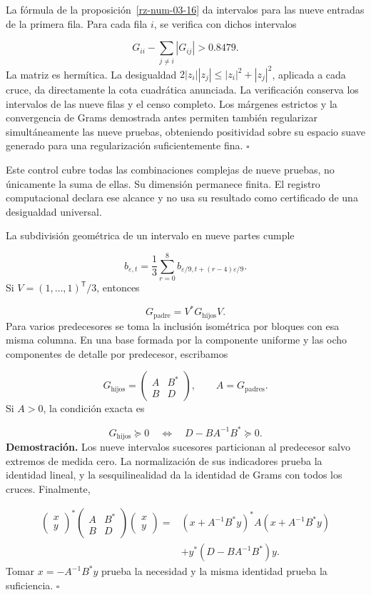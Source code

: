 La fórmula de la proposición~\ref{rz-num-03-16} da intervalos para las nueve entradas de la primera fila. Para cada fila \(i\), se verifica con dichos intervalos

\[
G_{ii}-\sum_{j\neq i}|G_{ij}|>0.8479.
\]
La matriz es hermítica. La desigualdad \(2|z_i||z_j|\leq|z_i|^2+|z_j|^2\), aplicada a cada cruce, da directamente la cota cuadrática anunciada. La verificación conserva los intervalos de las nueve filas y el censo completo. Los márgenes estrictos y la convergencia de Grams demostrada antes permiten también regularizar simultáneamente las nueve pruebas, obteniendo positividad sobre su espacio suave generado para una regularización suficientemente fina. \hfill\(\square\)

Este control cubre todas las combinaciones complejas de nueve pruebas, no únicamente la suma de ellas. Su dimensión permanece finita. El registro computacional declara ese alcance y no usa su resultado como certificado de una desigualdad universal.

La subdivisión geométrica de un intervalo en nueve partes cumple

\[
b_{\varepsilon,t}=\frac13\sum_{r=0}^8
b_{\varepsilon/9,t+(r-4)\varepsilon/9}.
\]
Si \(V=(1,\ldots,1)^{\mathsf T}/3\), entonces

\[
G_{\mathrm{padre}}=V^*G_{\mathrm{hijos}}V.
\]
Para varios predecesores se toma la inclusión isométrica por bloques con esa misma columna. En una base formada por la componente uniforme y las ocho componentes de detalle por predecesor, escribamos

\[
G_{\mathrm{hijos}}=
\begin{pmatrix}A&B^*\\B&D\end{pmatrix},\qquad
A=G_{\mathrm{padres}}.
\]
Si \(A>0\), la condición exacta es

\[
G_{\mathrm{hijos}}\succeq0
\quad\Longleftrightarrow\quad D-BA^{-1}B^*\succeq0.
\]
\textbf{Demostración.} Los nueve intervalos sucesores particionan al predecesor salvo extremos de medida cero. La normalización de sus indicadores prueba la identidad lineal, y la sesquilinealidad da la identidad de Grams con todos los cruces. Finalmente,

\[
\begin{aligned}
\begin{pmatrix}x\\y\end{pmatrix}^*
\begin{pmatrix}A&B^*\\B&D\end{pmatrix}
\begin{pmatrix}x\\y\end{pmatrix}
={}&(x+A^{-1}B^*y)^*A(x+A^{-1}B^*y)\\
&+y^*(D-BA^{-1}B^*)y.
\end{aligned}
\]
Tomar \(x=-A^{-1}B^*y\) prueba la necesidad y la misma identidad prueba la suficiencia. \hfill\(\square\)

